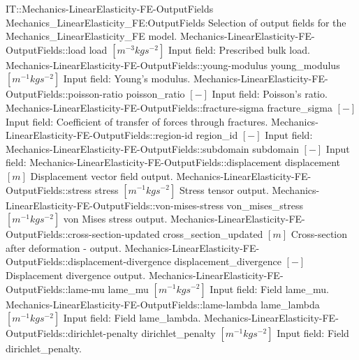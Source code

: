 \begin{SelectionType}
	{IT::Mechanics-LinearElasticity-FE-OutputFields}
	{Mechanics{\_}LinearElasticity{\_}FE:OutputFields}
	{{{Selection of output fields for the Mechanics{\_}LinearElasticity{\_}FE model.}%
}}
		\SelectionItem
			{Mechanics-LinearElasticity-FE-OutputFields::load}
			{load}
			{{{}{$[m^{-3}kgs^{-2}]$}{ Input field: Prescribed bulk load.}%
}}
		\SelectionItem
			{Mechanics-LinearElasticity-FE-OutputFields::young-modulus}
			{young{\_}modulus}
			{{{}{$[m^{-1}kgs^{-2}]$}{ Input field: Young's modulus.}%
}}
		\SelectionItem
			{Mechanics-LinearElasticity-FE-OutputFields::poisson-ratio}
			{poisson{\_}ratio}
			{{{}{$[-]$}{ Input field: Poisson's ratio.}%
}}
		\SelectionItem
			{Mechanics-LinearElasticity-FE-OutputFields::fracture-sigma}
			{fracture{\_}sigma}
			{{{}{$[-]$}{ Input field: Coefficient of transfer of forces through fractures.}%
}}
		\SelectionItem
			{Mechanics-LinearElasticity-FE-OutputFields::region-id}
			{region{\_}id}
			{{{}{$[-]$}{ Input field: }%
}}
		\SelectionItem
			{Mechanics-LinearElasticity-FE-OutputFields::subdomain}
			{subdomain}
			{{{}{$[-]$}{ Input field: }%
}}
		\SelectionItem
			{Mechanics-LinearElasticity-FE-OutputFields::displacement}
			{displacement}
			{{{}{$[m]$}{ Displacement vector field output.}%
}}
		\SelectionItem
			{Mechanics-LinearElasticity-FE-OutputFields::stress}
			{stress}
			{{{}{$[m^{-1}kgs^{-2}]$}{ Stress tensor output.}%
}}
		\SelectionItem
			{Mechanics-LinearElasticity-FE-OutputFields::von-mises-stress}
			{von{\_}mises{\_}stress}
			{{{}{$[m^{-1}kgs^{-2}]$}{ von Mises stress output.}%
}}
		\SelectionItem
			{Mechanics-LinearElasticity-FE-OutputFields::cross-section-updated}
			{cross{\_}section{\_}updated}
			{{{}{$[m]$}{ Cross-section after deformation - output.}%
}}
		\SelectionItem
			{Mechanics-LinearElasticity-FE-OutputFields::displacement-divergence}
			{displacement{\_}divergence}
			{{{}{$[-]$}{ Displacement divergence output.}%
}}
		\SelectionItem
			{Mechanics-LinearElasticity-FE-OutputFields::lame-mu}
			{lame{\_}mu}
			{{{}{$[m^{-1}kgs^{-2}]$}{ Input field: Field lame{\_}mu.}%
}}
		\SelectionItem
			{Mechanics-LinearElasticity-FE-OutputFields::lame-lambda}
			{lame{\_}lambda}
			{{{}{$[m^{-1}kgs^{-2}]$}{ Input field: Field lame{\_}lambda.}%
}}
		\SelectionItem
			{Mechanics-LinearElasticity-FE-OutputFields::dirichlet-penalty}
			{dirichlet{\_}penalty}
			{{{}{$[m^{-1}kgs^{-2}]$}{ Input field: Field dirichlet{\_}penalty.}%
}}
\end{SelectionType}
